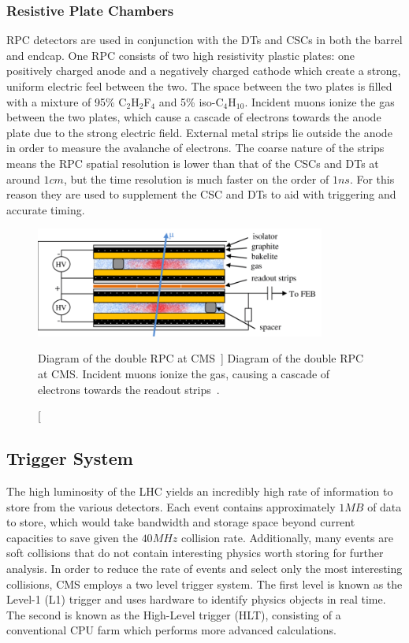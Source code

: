 \subsubsection{Resistive Plate Chambers} \label{sec:CMS_RPC}
RPC detectors are used in conjunction with the DTs and CSCs in both the barrel and endcap. One RPC consists of two high resistivity plastic plates: one positively charged anode and a negatively charged cathode which create a strong, uniform electric feel between the two. The space between the two plates is filled with a mixture of 95\% C$_2$H$_2$F$_4$ and 5\% iso-C$_4$H$_{10}$. Incident muons ionize the gas between the two plates, which cause a cascade of electrons towards the anode plate due to the strong electric field. External metal strips lie outside the anode in order to measure the avalanche of electrons. The coarse nature of the strips means the RPC spatial resolution is lower than that of the CSCs and DTs at around $1\unit{cm}$, but the time resolution is much faster on the order of $1\unit{ns}$. For this reason they are used to supplement the CSC and DTs to aid with triggering and accurate timing.

\begin{figure}[htpb]
	\centering
	\includegraphics[width=0.85\textwidth]{figs/03_experiment/Design1.png}
	\caption
	[Diagram of the double RPC at CMS~\cite{CMSRPC_HLLHC}]
	{Diagram of the double RPC at CMS. Incident muons ionize the gas, causing a cascade of electrons towards the readout strips~\cite{CMSRPC_HLLHC}.}
	\label{fig:RPC}
\end{figure}

\subsection{Trigger System} \label{sec:CMS_trig}
The high luminosity of the LHC yields an incredibly high rate of information to store from the various detectors. Each event contains approximately $1\unit{MB}$ of data to store, which would take bandwidth and storage space beyond current capacities to save given the $40\unit{MHz}$ collision rate. Additionally, many events are soft collisions that do not contain interesting physics worth storing for further analysis. In order to reduce the rate of events and select only the most interesting collisions, CMS employs a two level trigger system. The first level is known as the Level-1 (L1) trigger and uses hardware to identify physics objects in real time. The second is known as the High-Level trigger (HLT), consisting of a conventional CPU farm which performs more advanced calculations.

